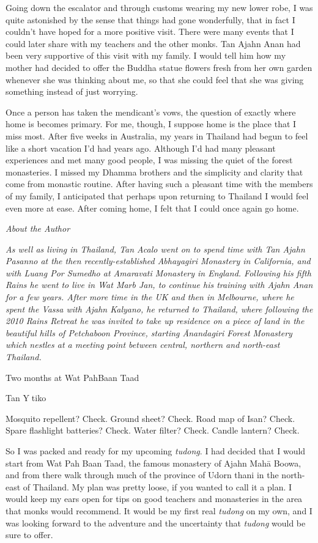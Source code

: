 Going down the escalator and through customs wearing my new lower robe,
I was quite astonished by the sense that things had gone wonderfully,
that in fact I couldn't have hoped for a more positive visit. There were
many events that I could later share with my teachers and the other
monks. Tan Ajahn Anan had been very supportive of this visit with my
family. I would tell him how my mother had decided to offer the Buddha
statue flowers fresh from her own garden whenever she was thinking about
me, so that she could feel that she was giving something instead of just
worrying.

Once a person has taken the mendicant's vows, the question of exactly
where home is becomes primary. For me, though, I suppose home is the
place that I miss most. After five weeks in Australia, my years in
Thailand had begun to feel like a short vacation I'd had years ago.
Although I'd had many pleasant experiences and met many good people, I
was missing the quiet of the forest monasteries. I missed my Dhamma
brothers and the simplicity and clarity that come from monastic routine.
After having such a pleasant time with the members of my family, I
anticipated that perhaps upon returning to Thailand I would feel even
more at ease. After coming home, I felt that I could once again go home.

\emph{About the Author}

\emph{As well as living in Thailand, Tan Acalo went on to spend time
with Tan Ajahn Pasanno at the then recently-established Abhayagiri
Monastery in California, and with Luang Por Sumedho at Amaravati
Monastery in England. Following his fifth Rains he went to live in Wat
Marb Jan, to continue his training with Ajahn Anan for a few years.
After more time in the UK and then in Melbourne, where he spent the
Vassa with Ajahn Kalyano, he returned to Thailand, where following the
2010 Rains Retreat he was invited to take up residence on a piece of
land in the beautiful hills of Petchaboon Province, starting Ānandagiri
Forest Monastery which nestles at a meeting point between central,
northern and north-east Thailand.}

Two months at Wat PahBaan Taad

Tan Ytiko

Mosquito repellent? Check. Ground sheet? Check. Road map of Isan? Check.
Spare flashlight batteries? Check. Water filter? Check. Candle lantern?
Check.

So I was packed and ready for my upcoming \emph{tudong}. I had decided
that I would start from Wat Pah Baan Taad, the famous monastery of Ajahn
Mahā Boowa, and from there walk through much of the province of Udorn
thani in the north-east of Thailand. My plan was pretty loose, if you
wanted to call it a plan. I would keep my ears open for tips on good
teachers and monasteries in the area that monks would recommend. It
would be my first real \emph{tudong} on my own, and I was looking
forward to the adventure and the uncertainty that \emph{tudong} would be
sure to offer.

